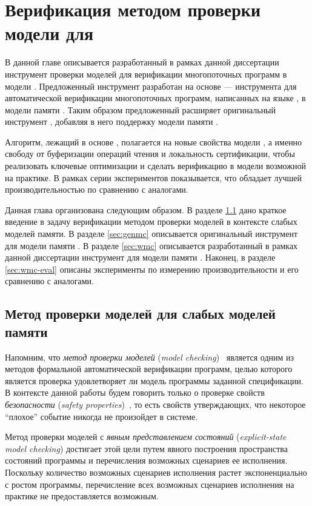 \chapter{Верификация методом проверки модели для \WkmS}
\label{ch:mc-weakestmo2}

В данной главе описывается разработанный в рамках данной диссертации 
инструмент проверки моделей \wmc для верификации 
многопоточных программ в модели \WkmS.
Предложенный инструмент разработан на основе \genmc --- 
инструмента для автоматической верификации многопоточных программ, 
написанных на языке \CLANG, в модели памяти \RCMM. 
Таким образом предложенный \wmc расширяет 
оригинальный инструмент \genmc, 
добавляя в него поддержку модели памяти \WkmS.  

Алгоритм, лежащий в основе \wmc, полагается на новые свойства модели \WkmS, 
а именно свободу от буферизации операций чтения и 
локальность сертификации, чтобы реализовать ключевые 
оптимизации и сделать верификацию в модели \WkmS возможной на практике.  
В рамках серии экспериментов показывается, что 
\wmc обладает лучшей производительностью по сравнению с аналогами.

Данная глава организована следующим образом. 
В разделе \ref{sec:mc-wmm} дано краткое введение 
в задачу верификации методом проверки моделей 
в контексте слабых моделей памяти.
В разделе \ref{sec:genmc} описывается оригинальный инструмент 
\genmc для модели памяти \RCMM.
В разделе \ref{sec:wmc} описывается разработанный в 
рамках данной диссертации инструмент \wmc для модели памяти \WkmS.
Наконец, в разделе \ref{sec:wmc-eval} описаны эксперименты 
по измерению производительности \wmc и его сравнению с аналогами.

\section{Метод проверки моделей для слабых моделей памяти}
\label{sec:mc-wmm}

Напомним, что \emph{метод проверки моделей} (\emph{model checking})~\cite{Baier:2008} 
является одним из методов формальной автоматической верификации программ,
целью которого является проверка удовлетворяет ли 
модель программы заданной спецификации. 
В контексте данной работы будем говорить только 
о проверке свойств \emph{безопасности} (\emph{safety properties})~\cite{Baier:2008}, 
то есть свойств утверждающих, что некоторое 
``плохое'' событие никогда не произойдет в системе. 

Метод проверки моделей с \emph{явным представлением состояний} 
(\emph{explicit-state model checking}) достигает 
этой цели путем явного построения пространства состояний программы 
и перечисления возможных сценариев ее исполнения.
Поскольку количество возможных сценариев исполнения 
растет экспоненциально с ростом программы, 
перечисление всех возможных сценариев исполнения 
на практике не предоставляется возможным. 

